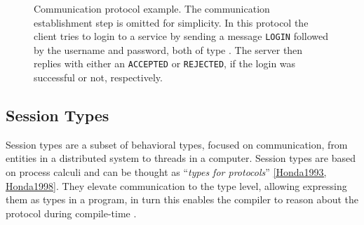 \begin{figure}
    \centering
    \caption{
        Communication protocol example. The communication establishment step is omitted for simplicity.
        In this protocol the client tries to login to a service by sending a message
        \texttt{LOGIN} followed by the username and password, both of type .
        The server then replies with either an \texttt{ACCEPTED} or \texttt{REJECTED}, if the login was successful or not, respectively.
    }
    \label{fig:login-protocol}
\end{figure}

\subsection{Session Types}

Session types are a subset of behavioral types, focused on communication,
from entities in a distributed system to threads in a computer.
Session types are based on process calculi and can be thought as “\emph{types for protocols}” \autoref{Honda1993, Honda1998}.
They elevate communication to the type level, allowing expressing them as types in a program,
in turn this enables the compiler to reason about the protocol during compile-time \autocite{Vasconcelos2006, Gay2015}.

